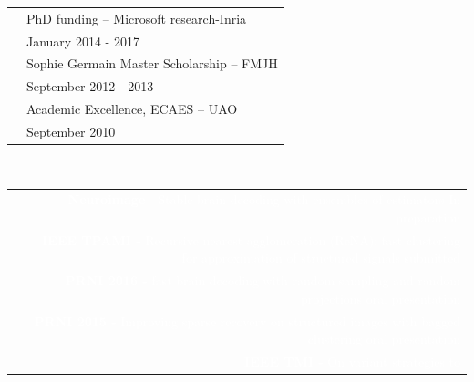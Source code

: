 \documentclass[letterpaper]{article}
\begin{document}
\begin{minipage}[t]{1\linewidth}
{\begin{minipage}[t]{0.47\linewidth}
\begin{minipage}{1\linewidth}
{\begin{minipage}{1\linewidth}
			\begin{tabularx}{1\textwidth}{rX}
				& {PhD funding -- Microsoft 
				research-Inria}\\			
				\vspace{1ex}								
				& {\small \textcolor{gray!40}{January 2014 - 2017}}\\			
				& {Sophie Germain Master Scholarship -- FMJH}\\
				\vspace{1ex}				
				& {\small \textcolor{gray!40}{September 2012 - 2013}}\\
				& {Academic Excellence, ECAES -- UAO}\\
				& {\small \textcolor{gray!40}{September 2010}}\\				
			\end{tabularx}
		\end{minipage}
		}
		\vspace{2ex}
	\end{minipage}
	\begin{minipage}{1\linewidth} %
		\vspace{2ex}		
		\\
		\vspace{2ex}
		\begin{minipage}{1\linewidth}
			\textcolor{white}{\normalsize 
			\begin{tabularx}{\textwidth}{cR}
				\smallskip
				& {\textbf{Neuroimage} - Stable brain decoding with 
				ensembles of estimators} \hfill \textcolor{gray!40}{In 
				preparation}\\
				\smallskip				
				& {\textbf{IEEE TPAMI -} Recursive nearest 
				agglomeration (ReNA): fast clustering for approximation of 
				structured signals} \hfill \textcolor{gray!40}{submitted}\\
				\smallskip				
				& {\textbf{PRNI 2016 -} fast brain decoding with 
				random sampling and random projections \hfill 
				\textcolor{gray!40}{oral presentation}}\\
				\smallskip				
				& {\textbf{PRNI 2015 -} Improving sparse recovery 
				on structured images with bagged clustering \hfill 
				\textcolor{gray!40}{oral presentation}}\\
				\smallskip				
				& {\textbf{IEEE TMI -}  On variant strategies to 
}
\end{tabularx}}
\end{minipage}
\end{minipage}
\end{minipage}}
\end{minipage}
\end{document}
